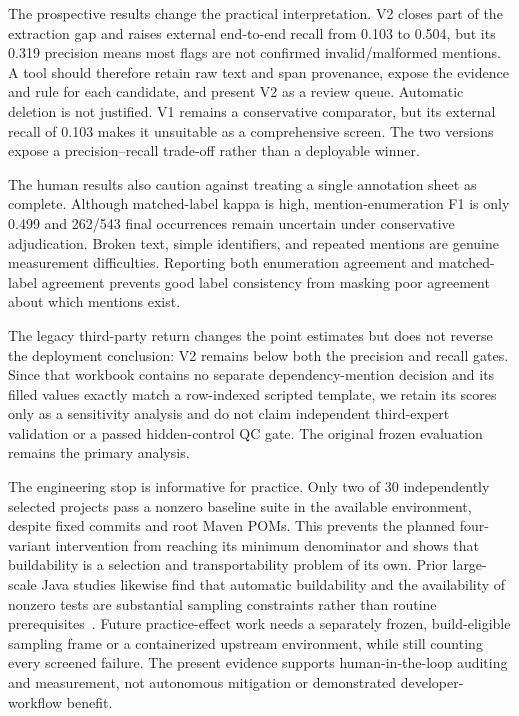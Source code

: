\documentclass[pdflatex,sn-basic]{sn-jnl}
\begin{document}
The prospective results change the practical interpretation. V2 closes part of the extraction gap and raises external end-to-end recall from 0.103 to 0.504, but its 0.319 precision means most flags are not confirmed invalid/malformed mentions. A tool should therefore retain raw text and span provenance, expose the evidence and rule for each candidate, and present V2 as a review queue. Automatic deletion is not justified. V1 remains a conservative comparator, but its external recall of 0.103 makes it unsuitable as a comprehensive screen. The two versions expose a precision--recall trade-off rather than a deployable winner.

The human results also caution against treating a single annotation sheet as complete. Although matched-label kappa is high, mention-enumeration F1 is only 0.499 and 262/543 final occurrences remain uncertain under conservative adjudication. Broken text, simple identifiers, and repeated mentions are genuine measurement difficulties. Reporting both enumeration agreement and matched-label agreement prevents good label consistency from masking poor agreement about which mentions exist.

The legacy third-party return changes the point estimates but does not reverse the deployment conclusion: V2 remains below both the precision and recall gates. Since that workbook contains no separate dependency-mention decision and its filled values exactly match a row-indexed scripted template, we retain its scores only as a sensitivity analysis and do not claim independent third-expert validation or a passed hidden-control QC gate. The original frozen evaluation remains the primary analysis.

The engineering stop is informative for practice. Only two of 30 independently selected projects pass a nonzero baseline suite in the available environment, despite fixed commits and root Maven POMs. This prevents the planned four-variant intervention from reaching its minimum denominator and shows that buildability is a selection and transportability problem of its own. Prior large-scale Java studies likewise find that automatic buildability and the availability of nonzero tests are substantial sampling constraints rather than routine prerequisites~\citep{Hassan2017AutomaticBuild,Khatami2024QA}. Future practice-effect work needs a separately frozen, build-eligible sampling frame or a containerized upstream environment, while still counting every screened failure. The present evidence supports human-in-the-loop auditing and measurement, not autonomous mitigation or demonstrated developer-workflow benefit.
\end{document}
